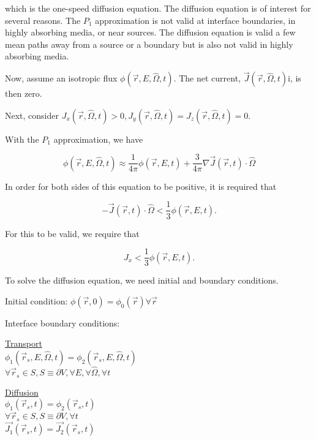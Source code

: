 \documentclass[12pt]{article}
\newcommand{\rvec}{\ensuremath{\vec{r}}}
\newcommand{\omvec}{\ensuremath{\hat{\Omega}}}
\begin{document}
which is the one-speed diffusion equation. The diffusion equation is of interest for several reasons. The
$P_1$ approximation is not valid at interface boundaries, in highly absorbing media, or near sources. The
diffusion equation is valid a few mean paths away from a source or a boundary but is also not valid in
highly absorbing media.


Now, assume an isotropic flux $\phi(\rvec,E,\omvec,t)$. The net current, $\vec{J}(\rvec,\omvec,t)$i, is 
then zero.


Next, consider $J_x(\rvec,\omvec,t) > 0, J_y(\rvec,\omvec,t) = J_z(\rvec,\omvec,t) = 0$.


With the $P_1$ approximation, we have

\begin{equation*}
\phi(\rvec,E,\omvec,t)\approx\frac{1}{4\pi}\phi(\rvec,E,t)+\frac{3}{4\pi}\nabla\vec{J}(\rvec,t)\cdot\omvec
\end{equation*}

In order for both sides of this equation to be positive, it is required that

\begin{equation*}
-\vec{J}(\rvec,t)\cdot\omvec < \frac{1}{3}\phi(\rvec,E,t).
\end{equation*}

For this to be valid, we require that

\begin{equation*}
J_x < \frac{1}{3}\phi(\rvec,E,t).
\end{equation*}

To solve the diffusion equation, we need initial and boundary conditions.


Initial condition: $\phi(\rvec,0) = \phi_0(\rvec) \forall\rvec$


Interface boundary conditions:

\begin{minipage}[t]{0.5\textwidth}
\underline{Transport} \\
$\phi_1(\rvec_s,E,\omvec,t) = \phi_2(\rvec_s,E,\omvec,t)$ \\
$\forall\rvec_s \in S, S \equiv \partial V, \forall E, \forall \omvec, \forall t$
\end{minipage}
\begin{minipage}[t]{0.5\textwidth}
\underline{Diffusion} \\
$\phi_1(\rvec_s,t) = \phi_2(\rvec_s,t)$ \\
$\forall\rvec_s \in S, S \equiv \partial V, \forall t$ \\
$\vec{J_1}(\rvec_s,t) = \vec{J_2}(\rvec_s,t)$
\end{minipage}
\end{document}
